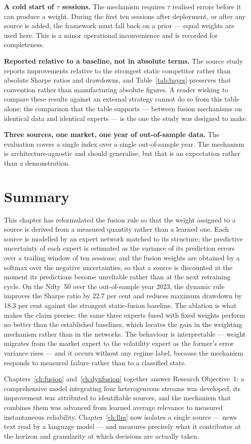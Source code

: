 \textbf{A cold start of $\tau$ sessions.} The mechanism requires $\tau$ realised errors before it
can produce a weight. During the first ten sessions after deployment, or after any source is
added, the framework must fall back on a prior --- equal weights are used here. This is a minor
operational inconvenience and is recorded for completeness.

\textbf{Reported relative to a baseline, not in absolute terms.} The source study reports
improvements relative to the strongest static competitor rather than absolute Sharpe ratios and
drawdowns, and Table~\ref{tab:bayes} preserves that convention rather than manufacturing absolute
figures. A reader wishing to compare these results against an external strategy cannot do so from
this table alone; the comparison that the table supports --- between fusion mechanisms on
identical data and identical experts --- is the one the study was designed to make.

\textbf{Three sources, one market, one year of out-of-sample data.} The evaluation covers a single
index over a single out-of-sample year. The mechanism is architecture-agnostic and should
generalise, but that is an expectation rather than a demonstration.

\section{Summary}

This chapter has reformulated the fusion rule so that the weight assigned to a source is derived
from a measured quantity rather than a learned one. Each source is modelled by an expert network
matched to its structure; the predictive uncertainty of each expert is estimated as the variance
of its prediction errors over a trailing window of ten sessions; and the fusion weights are
obtained by a softmax over the negative uncertainties, so that a source is discounted at the
moment its predictions become unreliable rather than at the next retraining cycle. On the
Nifty~50 over the out-of-sample year 2023, the dynamic rule improves the Sharpe ratio by 22.7 per
cent and reduces maximum drawdown by 18.3 per cent against the strongest static-fusion baseline.
The ablation is what makes the claim precise: the same three experts fused with fixed weights
perform no better than the established baselines, which locates the gain in the weighting
mechanism rather than in the networks. The behaviour is interpretable --- weight migrates from the
market expert to the volatility expert as the former's error variance rises --- and it occurs
without any regime label, because the mechanism responds to measured failure rather than to a
classified state.

Chapters~\ref{ch:fusion} and~\ref{ch:dynfusion} together answer Research Objective~1: a
comprehensive model integrating four heterogeneous streams was developed, its improvement was
attributed to identifiable sources, and the mechanism that combines them was advanced from learned
average relevance to measured instantaneous reliability. Chapter~\ref{ch:llm} now isolates a
single source --- news text read by a language model --- and measures precisely what it
contributes at the horizon and granularity at which decisions are actually taken.
